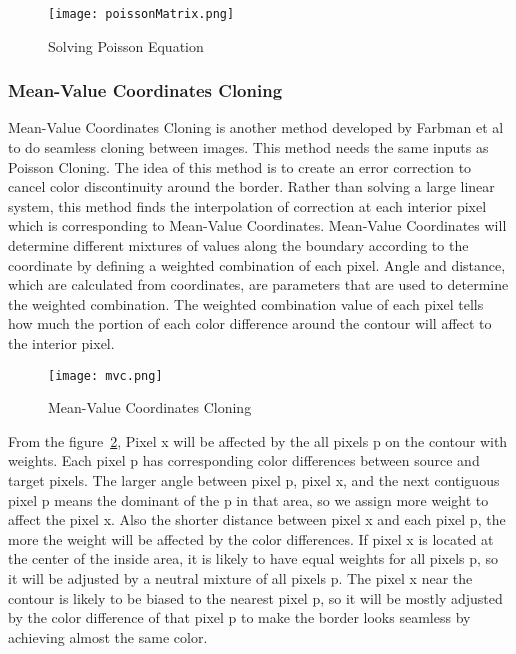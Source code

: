\begin{figure}[htb]
   \centering
   \texttt{[image: poissonMatrix.png]}
   \caption{Solving Poisson Equation}
   \label{fig:SolvingPoissonEquation}
\end{figure}

\subsubsection{Mean-Value Coordinates Cloning}
\hspace{0.5in}Mean-Value Coordinates Cloning is another method developed by Farbman et al\cite{Farbman2009} to do seamless cloning between images. This method needs the same inputs as Poisson Cloning. The idea of this method is to create an error correction to cancel color discontinuity around the border. Rather than solving a large linear system, this method finds the interpolation of correction at each interior pixel which is corresponding to Mean-Value Coordinates. Mean-Value Coordinates will determine different mixtures of values along the boundary according to the coordinate by defining a weighted combination of each pixel. Angle and distance, which are calculated from coordinates, are parameters that are used to determine the weighted combination. The weighted combination value of each pixel tells how much the portion of each color difference around the contour will affect to the interior pixel.

\begin{figure}[htb]
   \centering
   \texttt{[image: mvc.png]}
   \caption{Mean-Value Coordinates Cloning}
   \label{fig:MVC}
\end{figure}

From the figure~\ref{fig:MVC}, Pixel x will be affected by the all pixels p on the contour with weights. Each pixel p has corresponding color differences between source and target pixels. The larger angle between pixel p, pixel x, and the next contiguous pixel p means the dominant of the p in that area, so we assign more weight to affect the pixel x. Also the shorter distance between pixel x and each pixel p, the more the weight will be affected by the color differences. If pixel x is located at the center of the inside area, it is likely to have equal weights for all pixels p, so it will be adjusted by a neutral mixture of all pixels p. The pixel x near the contour is likely to be biased to the nearest pixel p, so it will be mostly adjusted by the color difference of that pixel p to make the border looks seamless by achieving almost the same color. 